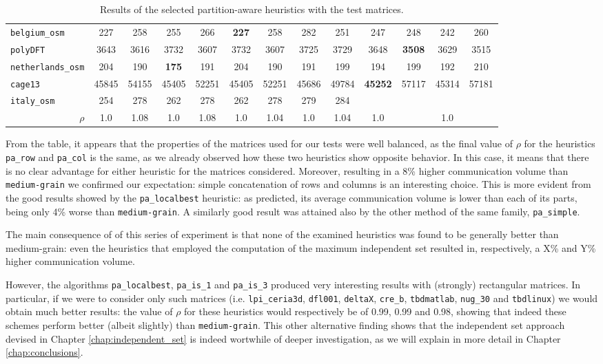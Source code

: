 \begin{table}
\begin{tabular}{|l|c|c||c|c||c|c||c|c||c|c||c|c|}
	\verb|belgium_osm| & 227 & 258 & 255 & 266 & \textbf{227} & 258 &  282 & 251 & 247 & 248 & 242 & 260 \\
	\verb|polyDFT| & 3643 & 3616 & 3732 & 3607 & 3732 &  3607 & 3725 & 3729 & 3648 & \textbf{3508} & 3629 & 3515 \\
	\verb|netherlands_osm| & 204 & 190 & \textbf{175} & 191 & 204 & 190 & 191 & 199 & 194 & 199 & 192 & 210 \\
	\verb|cage13| & 45845 & 54155 & 45405 & 52251 & 45405 & 52251 & 45686 & 49784 & \textbf{45252} & 57117 & 45314 & 57181\\
	\verb|italy_osm| & 254 & 278 & 262 & 278 &262 & 278 & 279 & 284 & & & &  \\ \hline
	\multicolumn{1}{|r|}{$\rho$}	& 1.0  & 1.08 & 1.0  & 1.08 & 1.0  & 1.04 & 1.0  & 1.04 & 1.0  & & 1.0  & \\ \hline
		\end{tabular}
	\caption{Results of the selected partition-aware heuristics with the test matrices.} \label{tab:final_pa}
\end{table}

From the table, it appears that the properties of the matrices used for our tests were well balanced, as the final value of $\rho$ for the heuristics \verb|pa_row| and \verb|pa_col| is the same, as we already observed how these two heuristics show opposite behavior. In this case, it means that there is no clear advantage for either heuristic for the matrices considered. Moreover, resulting in a 8\% higher communication volume than \verb|medium-grain| we confirmed our expectation: simple concatenation of rows and columns is an interesting choice. This is more evident from the good results showed by the \verb|pa_localbest| heuristic: as predicted, its average communication volume is lower than each of its parts, being only 4\% worse than \verb|medium-grain|. A similarly good result was attained also by the other method of the same family, \verb|pa_simple|.

The main consequence of of this series of experiment is that none of the examined heuristics was found to be generally better than medium-grain: even the heuristics that employed the computation of the maximum independent set resulted in, respectively, a X\% and Y\% higher communication volume. 

However, the algorithms \verb|pa_localbest|, \verb|pa_is_1| and \verb|pa_is_3| produced very interesting results with (strongly) rectangular matrices. In particular, if we were to consider only such matrices (i.e. \verb|lpi_ceria3d|, \verb|dfl001|, \verb|deltaX|, \verb|cre_b|, \verb|tbdmatlab|, \verb|nug_30| and \verb|tbdlinux|) we would obtain much better results: the value of $\rho$ for these heuristics would respectively be of 0.99, 0.99 and 0.98, showing that indeed these schemes perform better (albeit slightly) than \verb|medium-grain|. This other alternative finding shows that the independent set approach devised in Chapter \ref{chap:independent_set} is indeed wortwhile of deeper investigation, as we will explain in more detail in Chapter \ref{chap:conclusions}.
